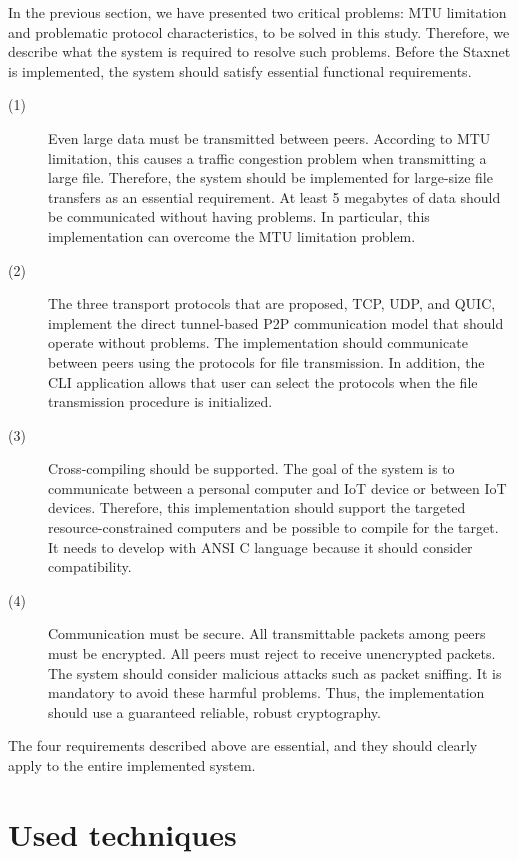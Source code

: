 In the previous section, we have presented two critical problems: MTU limitation and problematic protocol characteristics, to be solved in this study. Therefore, we describe what the system is required to resolve such problems. Before the Staxnet is implemented, the system should satisfy essential functional requirements.

\begin{description}
	\item[(1)]Even large data must be transmitted between peers. According to MTU limitation, this causes a traffic congestion problem when transmitting a large file. Therefore, the system should be implemented for large-size file transfers as an essential requirement. At least 5 megabytes of data should be communicated without having problems. In particular, this implementation can overcome the MTU limitation problem.
	\item[(2)]The three transport protocols that are proposed, TCP, UDP, and QUIC, implement the direct tunnel-based P2P communication model that should operate without problems. The implementation should communicate between peers using the protocols for file transmission. In addition, the CLI application allows that user can select the protocols when the file transmission procedure is initialized.
	
	\item[(3)]Cross-compiling should be supported. The goal of the system is to communicate between a personal computer and IoT device or between IoT devices. Therefore, this implementation should support the targeted resource-constrained computers and be possible to compile for the target. It needs to develop with ANSI C language because it should consider compatibility.
	
	\item[(4)]Communication must be secure. All transmittable packets among peers must be encrypted. All peers must reject to receive unencrypted packets. The system should consider malicious attacks such as packet sniffing. It is mandatory to avoid these harmful problems. Thus, the implementation should use a guaranteed reliable, robust cryptography.
	
\end{description}

The four requirements described above are essential, and they should clearly apply to the entire implemented system.

\section{Used techniques}

